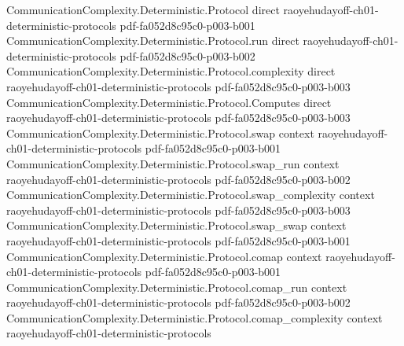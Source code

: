 \begin{theorem}
\label{CommunicationComplexity.Deterministic.mono_partition_of_communicationComplexity_le}
\leanok
{}
\proofstep
  {CommunicationComplexity.Deterministic.Protocol}
  {direct}
  {raoyehudayoff-ch01-deterministic-protocols}
  {pdf-fa052d8c95c0-p003-b001}
\proofstep
  {CommunicationComplexity.Deterministic.Protocol.run}
  {direct}
  {raoyehudayoff-ch01-deterministic-protocols}
  {pdf-fa052d8c95c0-p003-b002}
\proofstep
  {CommunicationComplexity.Deterministic.Protocol.complexity}
  {direct}
  {raoyehudayoff-ch01-deterministic-protocols}
  {pdf-fa052d8c95c0-p003-b003}
\proofstep
  {CommunicationComplexity.Deterministic.Protocol.Computes}
  {direct}
  {raoyehudayoff-ch01-deterministic-protocols}
  {pdf-fa052d8c95c0-p003-b003}
\proofstep
  {CommunicationComplexity.Deterministic.Protocol.swap}
  {context}
  {raoyehudayoff-ch01-deterministic-protocols}
  {pdf-fa052d8c95c0-p003-b001}
\proofstep
  {CommunicationComplexity.Deterministic.Protocol.swap_run}
  {context}
  {raoyehudayoff-ch01-deterministic-protocols}
  {pdf-fa052d8c95c0-p003-b002}
\proofstep
  {CommunicationComplexity.Deterministic.Protocol.swap_complexity}
  {context}
  {raoyehudayoff-ch01-deterministic-protocols}
  {pdf-fa052d8c95c0-p003-b003}
\proofstep
  {CommunicationComplexity.Deterministic.Protocol.swap_swap}
  {context}
  {raoyehudayoff-ch01-deterministic-protocols}
  {pdf-fa052d8c95c0-p003-b001}
\proofstep
  {CommunicationComplexity.Deterministic.Protocol.comap}
  {context}
  {raoyehudayoff-ch01-deterministic-protocols}
  {pdf-fa052d8c95c0-p003-b001}
\proofstep
  {CommunicationComplexity.Deterministic.Protocol.comap_run}
  {context}
  {raoyehudayoff-ch01-deterministic-protocols}
  {pdf-fa052d8c95c0-p003-b002}
\proofstep
  {CommunicationComplexity.Deterministic.Protocol.comap_complexity}
  {context}
  {raoyehudayoff-ch01-deterministic-protocols}

\end{theorem}
